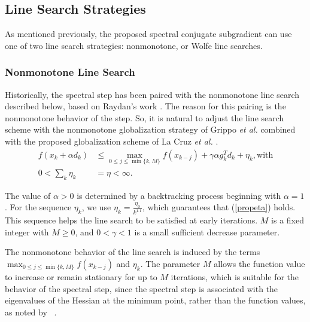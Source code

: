 \documentclass[]{interact}
\theoremstyle{plain}%
\theoremstyle{definition}
\theoremstyle{remark}
\begin{document}
\subsection{Line Search Strategies}
\label{sec:2.2}
As mentioned previously, the proposed spectral conjugate subgradient can use one of two line search strategies: nonmonotone, or Wolfe line searches.
\subsubsection{Nonmonotone Line Search}
\label{sec:2.2.1}
Historically, the spectral step has been paired with the nonmonotone line search described below, based on Raydan's work \cite{Raydan:97}. The reason for this pairing is the nonmonotone behavior of the step. So, it is natural to adjust the line search scheme with the nonmonotone globalization strategy of Grippo {\it et al.} \cite{GriLaLu:86} combined with the proposed globalization scheme of La Cruz {\it et al.} \cite{wmr2:05}.
\begin{align} \label{glb1}
f(x_k+\alpha d_k) &\leq  \max_{0 \leq j \leq \min\{k,M\}} f(x_{k-j}) + \gamma \alpha g_k^Td_k + \eta_k, \text{with}\\
\label{propeta}
0 < \sum_k \eta_k &= \eta < \infty.
\end{align}

{The value of $\alpha>0$ is determined by a backtracking process beginning with $\alpha=1$. For the sequence $\eta_k$, we use $\displaystyle\eta_k=\frac{\eta_0}{k^{1.1}}$, which guarantees that (\ref{propeta}) holds. This sequence helps the line search to be satisfied at early iterations. $M$ is a fixed integer with $M \geq 0$, and $0 < \gamma < 1$ is a small sufficient decrease parameter.}



The nonmonotone behavior of the line search is induced by the terms $\displaystyle\max_{0 \leq j \leq \min\{k,M\}} f(x_{k-j})$ and $\eta_k$. The parameter $M$ allows the function value to increase or remain stationary for up to $M$ iterations, which is suitable for the behavior of the spectral step, since the spectral step is associated with the eigenvalues of the Hessian at the minimum point, rather than the function values, as noted by ~\cite{fletcher:1990,glunt:1993}.
\end{document}
